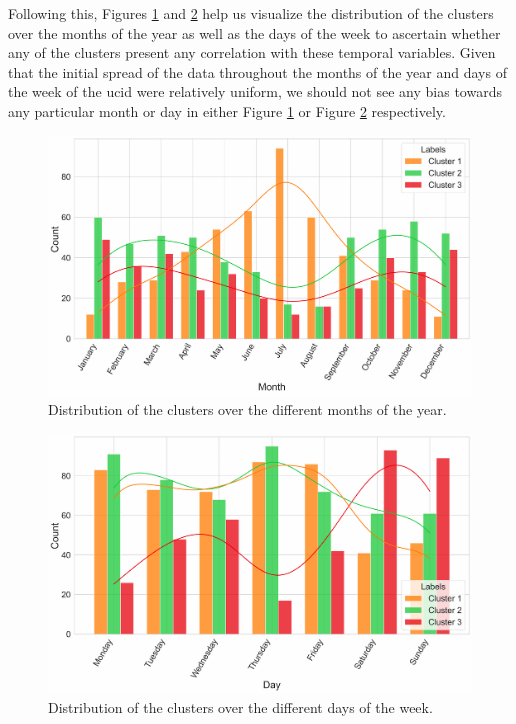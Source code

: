 \begin{adjustwidth}{-1.65cm}{-0.0cm}
\begin{enumerate}[label=Step 2.\arabic*:, leftmargin=*]
        \noindent \newline Following this, Figures \ref{fig:UCID-HDBSCAN-3} and \ref{fig:UCID-HDBSCAN-4} help us visualize the distribution of the clusters over the months of the year as well as the days of the week to ascertain whether any of the clusters present any correlation with these temporal variables. Given that the initial spread of the data throughout the months of the year and days of the week of the \gls{ucid} were relatively uniform, we should not see any bias towards any particular month or day in either Figure \ref{fig:UCID-HDBSCAN-3} or Figure \ref{fig:UCID-HDBSCAN-4} respectively.
        
        \begin{figure}[H]
            \centering
            \includegraphics[width=\textwidth]{Images/Chapter 5/Stage 2/UCID/UCID-HDBSCAN-3.pdf}
            \caption{Distribution of the clusters over the different months of the year.}
            \label{fig:UCID-HDBSCAN-3}
        \end{figure}
        
        \begin{figure}[H]
            \centering
            \includegraphics[width=\textwidth]{Images/Chapter 5/Stage 2/UCID/UCID-HDBSCAN-4.pdf}
            \caption{Distribution of the clusters over the different days of the week.}
            \label{fig:UCID-HDBSCAN-4}
        \end{figure}
        

\end{enumerate}
\end{adjustwidth}
